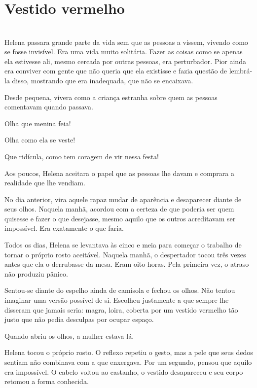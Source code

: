 \newpage

\ifdefined\useChapters
\chapter{Vestido vermelho}
\else
\chapter{}
\fi

Helena passara grande parte da vida sem que as pessoas a vissem, vivendo como se fosse invisível. Era uma vida muito solitária. Fazer as coisas como se apenas ela estivesse ali, mesmo cercada por outras pessoas, era perturbador. Pior ainda era conviver com gente que não queria que ela existisse e fazia questão de lembrá-la disso, mostrando que era inadequada, que não se encaixava.

Desde pequena, vivera como a criança estranha sobre quem as pessoas comentavam quando passava.

Olha que menina feia!

Olha como ela se veste!

Que ridícula, como tem coragem de vir nessa festa!

Aos poucos, Helena aceitara o papel que as pessoas lhe davam e comprara a realidade que lhe vendiam.

No dia anterior, vira aquele rapaz mudar de aparência e desaparecer diante de seus olhos. Naquela manhã, acordou com a certeza de que poderia ser quem quisesse e fazer o que desejasse, mesmo aquilo que os outros acreditavam ser impossível. Era exatamente o que faria.

Todos os dias, Helena se levantava às cinco e meia para começar o trabalho de tornar o próprio rosto aceitável. Naquela manhã, o despertador tocou três vezes antes que ela o derrubasse da mesa. Eram oito horas. Pela primeira vez, o atraso não produziu pânico.

Sentou-se diante do espelho ainda de camisola e fechou os olhos. Não tentou imaginar uma versão possível de si. Escolheu justamente a que sempre lhe disseram que jamais seria: magra, loira, coberta por um vestido vermelho tão justo que não pedia desculpas por ocupar espaço.

Quando abriu os olhos, a mulher estava lá.

Helena tocou o próprio rosto. O reflexo repetiu o gesto, mas a pele que seus dedos sentiam não combinava com a que enxergava. Por um segundo, pensou que aquilo era impossível. O cabelo voltou ao castanho, o vestido desapareceu e seu corpo retomou a forma conhecida.

